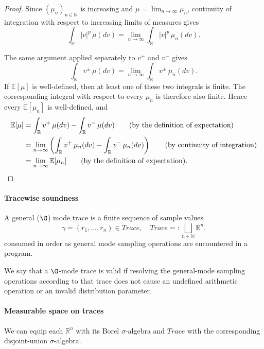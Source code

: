 \begin{proof}
  Since $(\mu_n)_{n\in\mathbb N}$ is increasing and
  $\mu=\lim_{n\to\infty}\mu_n$, continuity of integration with
  respect to increasing limits of measures gives
  \[
    \int_{\mathbb R}|v|^p\,\mu(dv)
    =
    \lim_{n\to\infty}
    \int_{\mathbb R}|v|^p\,\mu_n(dv).
  \]

  The same argument applied separately to $v^+$ and $v^-$ gives
  \[
    \int_{\mathbb R}v^\pm\,\mu(dv)
    =
    \lim_{n\to\infty}
    \int_{\mathbb R}v^\pm\,\mu_n(dv).
  \]
  If $\mathbb E[\mu]$ is well-defined, then at least one of these two
  integrals is finite. The corresponding integral with respect to
  every $\mu_n$ is therefore also finite. Hence every
  $\mathbb E[\mu_n]$ is well-defined, and
  \begin{align}
    \mathbb E[\mu]
    &=
    \int_{\mathbb R}v^+\,\mu(dv)
    -
    \int_{\mathbb R}v^-\,\mu(dv)
    \tag{\text{by the definition of expectation}}
    \\
    &=
    \lim_{n\to\infty}
    \left(
      \int_{\mathbb R}v^+\,\mu_n(dv)
      -
      \int_{\mathbb R}v^-\,\mu_n(dv)
    \right)
    \tag{\text{by continuity of integration}}
    \\
    &=
    \lim_{n\to\infty}\mathbb E[\mu_n]
    \tag{\text{by the definition of expectation}}.
  \end{align}
\end{proof}



\paragraph{Tracewise soundness}

\begin{definition}
  A general ($\G$) mode trace is a finite sequence of sample values
  \[
    \gamma=(r_1,\ldots,r_n) \in Trace,
    \quad
    Trace =: \bigsqcup_{n\in\mathbb N}\mathbb R^n.
  \]
  consumed in order as general mode sampling operations are encountered in a program.
\end{definition}

We say that a $\G$-mode trace is valid if resolving the general-mode sampling operations according to that trace does not cause an undefined arithmetic operation or an invalid distribution parameter.

\paragraph{Measurable space on traces}
We can equip each $\mathbb R^n$ with its Borel $\sigma$-algebra and $Trace$ with the corresponding disjoint-union $\sigma$-algebra. 

